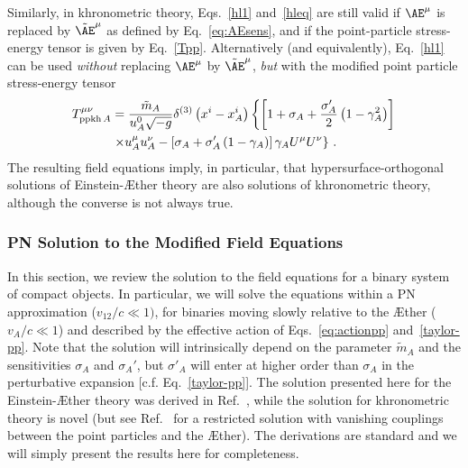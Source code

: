 \documentclass[prd,aps,twocolumn,nofootinbib,showpacs,superscriptaddress]{revtex4-1}
\def\m{\mu}
\def\n{\nu}
\newcommand{\nn}{\nonumber}
\begin{document}
Similarly, in  khronometric theory,
Eqs.~\eqref{hl1} and~\eqref{hleq} are still valid if $\AE^\mu$ is replaced by $\tilde{\AE}^\mu$ as defined by Eq.~\eqref{eq:AEsens}, and if
the point-particle stress-energy tensor is given by Eq.~\eqref{Tpp}. Alternatively (and equivalently), Eq.~\eqref{hl1} can be used
\textit{without} replacing  $\AE^\mu$ by $\tilde{\AE}^\mu$, \textit{but} with the modified point particle stress-energy tensor
\begin{align}
T^{\mu \nu}_{{\rm ppkh}\,A} &= \frac{\tilde{m}_{A}}{u_{A}^{0} \sqrt{-g}} \delta^{(3)}\left(x^{i} - x^{i}_{A}\right) 
\left\{ \left[ 1 + \sigma_{A} + \frac{\sigma_{A}'}{2} \left(1 - \gamma^2_{A}\right) \right] 
\right.
\nn \\
&\left.
\times u^{\mu}_{A} u^{\nu}_{A} -  \left[\sigma_{A} + \sigma_{A}' \left(1 - \gamma_{A}\right) \right]
\gamma_AU^\m
U^\n \right\}\,.
\end{align}
%
The resulting field equations imply, in particular, that hypersurface-orthogonal solutions of Einstein-\AE ther theory are also solutions of khronometric theory, although the 
converse is not always true.

\subsubsection{PN Solution to the Modified Field Equations}
\label{sec:PNsols}

In this section, we review the solution to the field equations 
for a binary system of compact objects. In particular, we will
solve the equations within a PN approximation ($v_{12}/c\ll 1)$, for binaries
moving slowly relative to the \AE ther ($v_A/c\ll 1$) and described by the effective action of Eqs.~\eqref{eq:actionpp} and~\eqref{taylor-pp}.
Note that the solution will intrinsically depend on the parameter $\tilde m_A$ and 
the sensitivities $\sigma_{A}$ and $\sigma_{A}'$, but 
$\sigma'_{A}$ will enter at higher order than $\sigma_{A}$ in the perturbative expansion [c.f. Eq.~\eqref{taylor-pp}].
The solution presented here for the Einstein-\AE ther theory was derived in Ref.~\cite{Foster:2007gr}, while
the solution for khronometric theory is novel (but see Ref.~\cite{Blas:2011zd} for
a restricted solution with vanishing couplings between the point particles and the \AE ther). 
The derivations are standard and we will simply present the results here for completeness. 
\end{document}
